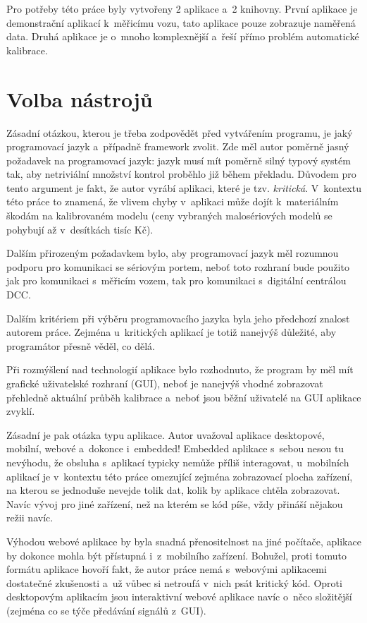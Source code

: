 Pro potřeby této práce byly vytvořeny 2 aplikace a~2 knihovny. První aplikace je
demonstrační aplikací k~měřicímu vozu, tato aplikace pouze zobrazuje naměřená
data. Druhá aplikace je o~mnoho komplexnější a~řeší přímo problém automatické
kalibrace.

\section{Volba nástrojů}
\label{sec:sw-nastroje}

Zásadní otázkou, kterou je třeba zodpovědět před vytvářením programu, je
jaký programovací jazyk a~případně framework zvolit. Zde měl autor poměrně
jasný požadavek na programovací jazyk: jazyk musí mít poměrně silný typový
systém tak, aby netriviální množství kontrol proběhlo již během překladu.
Důvodem pro tento argument je fakt, že autor vyrábí aplikaci, které je tzv.
\textit{kritická}. V~kontextu této práce to znamená, že vlivem chyby
v~aplikaci může dojít k~materiálním škodám na kalibrovaném modelu (ceny
vybraných malosériových modelů se pohybují až v~desítkách tisíc Kč).

Dalším přirozeným požadavkem bylo, aby programovací jazyk měl rozumnou podporu
pro komunikaci se sériovým portem, neboť toto rozhraní bude použito jak pro
komunikaci s~měřicím vozem, tak pro komunikaci s~digitální centrálou DCC.

Dalším kritériem při výběru programovacího jazyka byla jeho předchozí znalost
autorem práce. Zejména u~kritických aplikací je totiž nanejvýš důležité, aby
programátor přesně věděl, co dělá.

Při rozmýšlení nad technologií aplikace bylo rozhodnuto, že program by měl
mít grafické uživatelské rozhraní (GUI), neboť je nanejvýš vhodné zobrazovat
přehledně aktuální průběh kalibrace a~neboť jsou běžní uživatelé na GUI
aplikace zvyklí.

Zásadní je pak otázka typu aplikace. Autor uvažoval aplikace desktopové,
mobilní, webové a~dokonce i~embedded! Embedded aplikace s~sebou nesou tu
nevýhodu, že obsluha s~aplikací typicky nemůže příliš interagovat, u~mobilních
aplikací je v~kontextu této práce omezující zejména zobrazovací plocha
zařízení, na kterou se jednoduše nevejde tolik dat, kolik by aplikace chtěla
zobrazovat. Navíc vývoj pro jiné zařízení, než na kterém se kód píše, vždy
přináší nějakou režii navíc.

Výhodou webové aplikace by byla snadná přenositelnost na jiné počítače,
aplikace by dokonce mohla být přístupná i~z~mobilního zařízení. Bohužel, proti
tomuto formátu aplikace hovoří fakt, že autor práce nemá s~webovými aplikacemi
dostatečné zkušenosti a~už vůbec si netroufá v~nich psát kritický kód.
Oproti desktopovým aplikacím jsou interaktivní webové aplikace navíc o~něco
složitější (zejména co se týče předávání signálů z~GUI).

